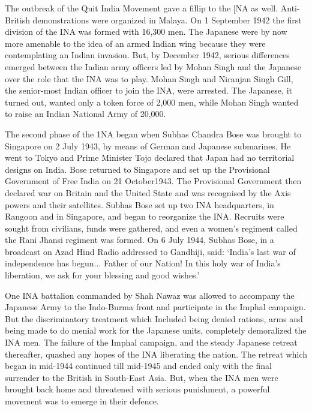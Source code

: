 The outbreak of the Quit India Movement gave a fillip to the [NA as well. Anti-British demonstrations were organized in Malaya. On 1 September 1942 the first division of the INA was formed with 16,300 men. The Japanese were by now more amenable to the idea of an armed Indian wing because they were contemplating an Indian invasion. But, by December 1942, serious differences emerged between the Indian army officers led by Mohan Singh and the Japanese over the role that the INA was to play. Mohan Singh and Niranjan Singh Gill, the senior-most Indian officer to join the INA, were arrested. The Japanese, it turned out, wanted only a token force of 2,000 men, while Mohan Singh wanted to raise an Indian National Army of 20,000.

The second phase of the 1NA began when Subhas Chandra Bose was brought to Singapore on 2 July 1943, by means of German and Japanese submarines. He went to Tokyo and Prime Minister Tojo declared that Japan had no territorial designs on India. Bose returned to Singapore and set up the Provisional Government of Free India on 21 October1943. The Provisional Government then declared war on Britain and the United State and was recognised by the Axis powers and their satellites. Subhas Bose set up two INA headquarters, in Rangoon and in Singapore, and began to reorganize the INA. Recruits were sought from civilians, funds were gathered, and even a women's regiment called the Rani Jhansi regiment was formed. On 6 July 1944, Subhas Bose, in a broadcast on Azad Hind Radio addressed to Gandhiji, said: `India's last war of independence has begun... Father of our Nation! In this holy war of India's liberation, we ask for your blessing and good wishes.'

One INA battalion commanded by Shah Nawaz was allowed to accompany the Japanese Army to the Indo-Burma front and participate in the Imphal campaign. But the discriminatory treatment which Included being denied rations, arms and being made to do menial work for the Japanese units, completely demoralized the INA men. The failure of the Imphal campaign, and the steady Japanese retreat thereafter, quashed any hopes of the INA liberating the nation. The retreat which began in mid-1944 continued till mid-1945 and ended only with the final surrender to the British in South-East Asia. But, when the INA men were brought back home and threatened with serious punishment, a powerful movement was to emerge in their defence.
